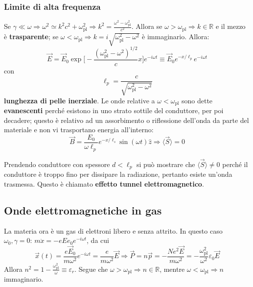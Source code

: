 \documentclass[10pt, a4paper]{scrartcl}
\numberwithin{equation}{subsection}
\theoremstyle{style1}
\begin{document}
\subsubsection{Limite di alta frequenza}
Se $\gamma \ll \omega\Rightarrow  \omega^2 \simeq k^2 c^2 + \omega_\text{pl}^2\Rightarrow k^2 = \frac{\omega^2 -\omega_\text{pl}^2}{c^2}$. Allora se $\omega > \omega_\text{pl}\Rightarrow k \in \mathbb{R}$ e il mezzo \`e \textbf{trasparente}; se $\omega < \omega_\text{pl} \Rightarrow k = i \sqrt{\omega_\text{pl}^2 - \omega^2} $ \`e immaginario. Allora:
\[
\vec{E}= \vec{E}_0 \exp \Bigg[ - \frac{(\omega_\text{pl}^2 -\omega^2)^{1 / 2} }{c}x \Bigg] e^{-i\omega t} \equiv\vec{E}_0 e^{ - x / \ell _p}  e^{-i\omega t} 
\] 
con 
\begin{equation}
	\ell _p = \frac{c}{\sqrt{\omega_\text{pl}^2 - \omega^2} }
\end{equation}
\textbf{lunghezza di pelle inerziale}. Le onde relative a $\omega < \omega_\text{pl}$ sono dette \textbf{evanescenti} perch\'e esistono in uno strato sottile del conduttore, per poi decadere; questo \`e relativo ad un assorbimento o riflessione dell'onda da parte del materiale e non vi trasportano energia all'interno:
\begin{equation}
	\vec{B}= \frac{E_0}{\omega \ell_p}e^{- x / \ell_s} \sin (\omega t) \hat{z}\Rightarrow \langle \vec{S} \rangle=0
\end{equation}

Prendendo conduttore con spessore $d<\ell _p$ si pu\`o mostrare che $\langle \vec{S} \rangle\neq 0$ perch\'e il conduttore \`e troppo fino per dissipare la radiazione, pertanto esiste un'onda trasmessa. Questo \`e chiamato \textbf{effetto tunnel elettromagnetico}.

\subsection{Onde elettromagnetiche in gas}
La materia ora \`e un gas di elettroni libero e senza attrito. In questo caso $\omega_0,\gamma = 0$: $m\ddot{x} = - eE e_0e^{-i\omega t} $, da cui
\begin{equation}
	\vec{x}(t) = \frac{e\vec{E}_0}{m\omega^2}e^{-i\omega t} = \frac{e}{m\omega^2}\vec{E} \Rightarrow \vec{P}= n\vec{p}= - \frac{Ne^2 \vec{E}}{m\omega^2} = - \frac{\omega_\text{pl}^2}{\omega^2}\varepsilon _0 \vec{E}
\end{equation}
Allora $n^2 = 1 - \frac{\omega_\text{pl}^2}{\omega} \equiv \varepsilon _r$. Segue che $\omega>\omega_\text{pl}\Rightarrow n \in \mathbb{R}$, mentre $\omega < \omega_\text{pl}\Rightarrow n$ immaginario.
\newpage
\end{document}
